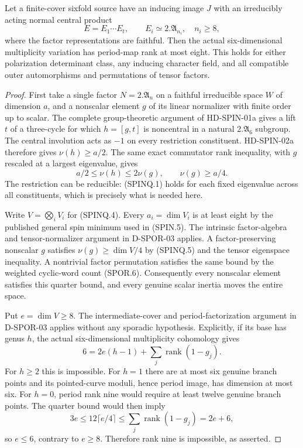 \begin{theorem}
\label{HD-SPIN-02b}
Let a finite-cover sixfold source have an inducing image $J$
with an irreducibly acting normal central product
\[
                  E=E_1\cdots E_t,\qquad
                  E_i\simeq2.\mathfrak A_{n_i},\quad n_i\ge8,
                                                               \tag{SPINQ.4}
\]
where the factor representations are faithful.  Then the actual
six-dimensional multiplicity variation has period-map rank at
most eight.  This holds for either polarization determinant class,
any inducing character field, and all compatible outer
automorphisms and permutations of tensor factors.
\end{theorem}

\begin{proof}
First take a single factor $N=2.\mathfrak A_n$ on a faithful
irreducible space $W$ of dimension $a$, and a nonscalar element
$g$ of its linear normalizer with finite order up to scalar.
The complete group-theoretic argument of HD-SPIN-01a gives a
lift $t$ of a three-cycle for which $h=[g,t]$ is noncentral in
a natural $2.\mathfrak A_6$ subgroup.  The central involution
acts as $-1$ on every restriction constituent.  HD-SPIN-02a
therefore gives $\nu(h)\ge a/2$.  The same exact commutator
rank inequality, with $g$ rescaled at a largest eigenvalue, gives
\[
                  a/2\le\nu(h)\le2\nu(g),
                  \qquad \nu(g)\ge a/4.                    \tag{SPINQ.5}
\]
The restriction can be reducible: (SPINQ.1) holds for each fixed
eigenvalue across all constituents, which is precisely what is
needed here.

Write $V=\bigotimes_iV_i$ for (SPINQ.4).  Every $a_i=\dim V_i$
is at least eight by the published general spin minimum used in
(SPIN.5).  The intrinsic factor-algebra and tensor-normalizer
argument in D-SPOR-03 applies.  A factor-preserving nonscalar
$g$ satisfies $\nu(g)\ge\dim V/4$ by (SPINQ.5) and the tensor
eigenspace inequality.  A nontrivial factor permutation satisfies
the same bound by the weighted cyclic-word count (SPOR.6).
Consequently every nonscalar element satisfies this quarter bound,
and every genuine scalar inertia moves the entire space.

Put $e=\dim V\ge8$.  The intermediate-cover and period-factorization
argument in D-SPOR-03 applies without any sporadic hypothesis.
Explicitly, if its base has genus $h$, the actual six-dimensional
multiplicity cohomology gives
\[
          6=2e(h-1)+\sum_j\operatorname{rank}(1-g_j).
\]
For $h\ge2$ this is impossible.  For $h=1$ there are at most six
genuine branch points and its pointed-curve moduli, hence period
image, has dimension at most six.  For $h=0$, period rank nine
would require at least twelve genuine branch points.  The
quarter bound would then imply
\[
          3e\le12\lceil e/4\rceil
             \le\sum_j\operatorname{rank}(1-g_j)=2e+6,
\]
so $e\le6$, contrary to $e\ge8$.  Therefore rank nine is
impossible, as asserted.
\end{proof}

